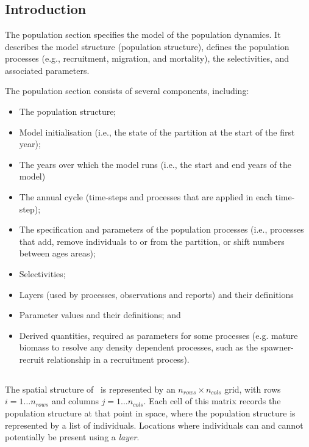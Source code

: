 \section{\label{sec:population-section}}

\subsection{Introduction}
The population section specifies the model of the population dynamics. It describes the model structure (population structure), defines the population processes (e.g., recruitment, migration, and mortality), the selectivities, and associated parameters.

The population section consists of several components, including:
\begin{itemize}
  \item The population structure;
  \item Model initialisation (i.e., the state of the partition at the start of the first year);
  \item The years over which the model runs (i.e., the start and end years of the model)
  \item The annual cycle (time-steps and processes that are applied in each time-step);
  \item The specification and parameters of the population processes (i.e., processes that add, remove individuals to or from the partition, or shift numbers between ages areas);
  \item Selectivities;
  \item Layers (used by processes, observations and reports) and their definitions
  \item Parameter values and their definitions; and
  \item Derived quantities, required as parameters for some processes (e.g. mature biomass to resolve any density dependent processes, such as the spawner-recruit relationship in a recruitment process).
\end{itemize}

\subsection{\label{sec:spatial-structure}}

The spatial structure of \IBM\ is represented by an $n_{rows} \times n_{cols}$ grid, with rows $i=1 \dots n_{rows}$ and columns $j=1 \ldots n_{cols}$. Each cell of this matrix records the population structure at that point in space, where the population structure is represented by a list of individuals. Locations where individuals can and cannot potentially be present using a \emph{layer}. 

